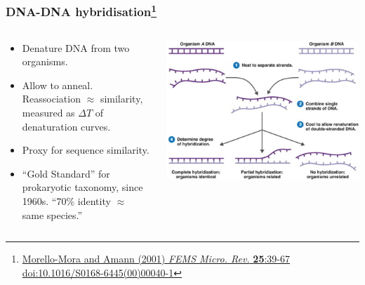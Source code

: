 \begin{frame}
  \frametitle{DNA-DNA hybridisation\footnote{\tiny{\href{http://dx.doi.org/10.1016/S0168-6445(00)00040-1}{Morello-Mora and Amann (2001) \textit{FEMS Micro. Rev.} \textbf{25}:39-67 doi:10.1016/S0168-6445(00)00040-1}}}}
  \begin{columns}[T]
    \begin{column}{5cm}
      \begin{itemize}
        \item Denature DNA from two organisms.
        \item Allow to anneal. Reassociation $\approx$ similarity, measured as $\Delta T$  of denaturation curves.
        \item Proxy for sequence similarity.
        \item ``Gold Standard'' for prokaryotic taxonomy, since 1960s. ``70\% identity $\approx$ same species.''
      \end{itemize}
    \end{column}
    \begin{column}{5cm}
      \includegraphics[width=1\textwidth]{images/ddh}
    \end{column}
  \end{columns}
\end{frame}

